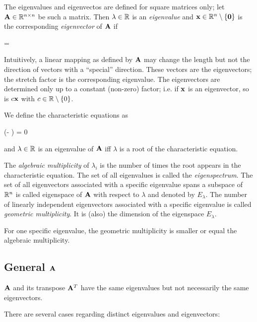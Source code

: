 
The eigenvalues and eigenvectos are defined for square matrices only; let $\mathbf{A} \in \mathbb{R}^{n \times n}$ be such a matrix. Then $\lambda \in \mathbb{R}$ is an \emph{eigenvalue} and $\mathbf{x} \in \mathbb{R}^n \setminus \{\mathbf{0}\}$ is the corresponding \emph{eigenvector} of $\mathbf{A}$ if

\bee
\Abf \xbf = \lambda \xbf
\eee

Intuitively, a linear mapping as defined by $\mathbf{A}$ may change the length but not the direction of vectors with a ``special'' direction. These vectors are the eigenvectors; the stretch factor is the corresponding eigenvalue. The eigenvectors are determined only up to a constant (non-zero) factor; i.e. if $\mathbf{x}$ is an eigenvector, so is $c \mathbf{x}$ with $c \in \mathbb{R} \setminus\{0\}$.

We define the characteristic equations as

\bee
\det (\Abf - \lambda \xbf) = 0
\eee

and $\lambda \in \mathbb{R}$ is an eigenvalue of $\mathbf{A}$ iff $\lambda$ is a root of the characteristic equation.

The \emph{algebraic multiplicity} of $\lambda_i$ is the number of times the root appears in the characteristic equation. The set of all eigenvalues is called the \emph{eigenspectrum}. The set of all eigenvectors associated with a specific eigenvalue spans a subspace of $\mathbb{R}^n$ is called eigenspace of $\mathbf{A}$ with respect to $\lambda$ and denoted by $E_\lambda$. The number of linearly independent eigenvectors associated with a specific eigenvalue is called \emph{geometric multiplicity}. It is (also) the dimension of the eigenspace $E_\lambda$.

For one specific eigenvalue, the geometric multiplicity is smaller or equal the algebraic multiplicity.

\subsection{General $\mathbf{A}$}

$\mathbf{A}$ and its transpose $\mathbf{A}^T$ have the same eigenvalues but not necessarily the same eigenvectors.

There are several cases regarding distinct eigenvalues and eigenvectors:

